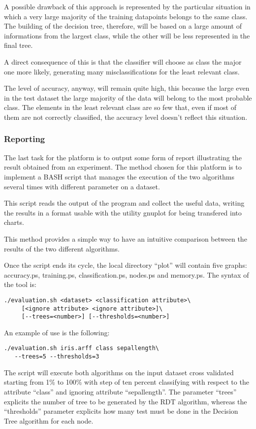 \documentclass{acm_proc_article-sp-sigmod07}
\begin{document}
A possible drawback of this approach is represented by the particular
situation in which a very large majority of the training datapoints
belongs to the same class.
The building of the decision tree, therefore, will be based on a large
amount of informations from the largest class, while the other will be
less represented in the final tree.

A direct consequence of this is that the classifier will choose as class
the major one more likely, generating many misclassifications for the
least relevant class.

The level of accuracy, anyway, will remain quite high, this because the
large even in the test dataset the large majority of the data will belong
to the most probable class. The elements in the least relevant class are
so few that, even if most of them are not correctly classified, the
accuracy level doesn't reflect this situation.

\subsubsection{Reporting}
The last task for the platform is to output some form of report
illustrating the result obtained from an experiment.
The method chosen for this platform is to implement a BASH script that
manages the execution of the two algorithms several times with different
parameter on a dataset.

This script reads the output of the program and collect the useful data,
writing the results in a format usable with the utility gnuplot for being
transfered into charts.

This method provides a simple way to have an intuitive comparison between the
results of the two different algorithms.

Once the script ends its cycle, the local directory ``plot'' will contain
five graphs: accuracy.ps, training.ps, classification.ps, nodes.ps and
memory.ps. The syntax of the tool is:
\begin{verbatim}
./evaluation.sh <dataset> <classification attribute>\
     [<ignore attribute> <ignore attribute>]\
     [--trees=<number>] [--thresholds=<number>]
\end{verbatim}

An example of use is the following:
\begin{verbatim}
./evaluation.sh iris.arff class sepallength\
   --trees=5 --thresholds=3
\end{verbatim}

The script will execute both algorithms on the input dataset cross
validated starting from 1\% to 100\% with step of ten percent classifying
with respect to the attribute ``class'' and ignoring attribute
``sepallength''. The parameter ``trees'' explicits the number of tree to be
generated by the RDT algorithm, whereas the ``thresholds'' parameter
explicits how many test must be done in the Decision Tree algorithm for
each node.
\end{document}
